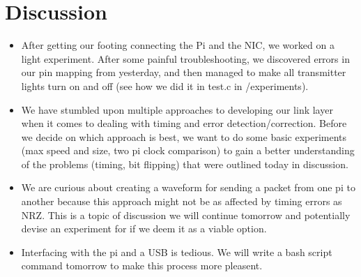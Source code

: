 \documentclass{article}
\begin{document}
\section*{Discussion}
\begin{itemize}
\item After getting our footing connecting the Pi and the NIC, we worked on a light experiment. After some
painful troubleshooting, we discovered errors in our pin mapping from yesterday, and then managed to make all
transmitter lights turn on and off (see how we did it in test.c in /experiments).
\item We have stumbled upon multiple approaches to developing our link layer when it comes to dealing with timing and error detection/correction. 
Before we decide on which approach is best, we want to do some basic experiments (max speed and size, two pi clock comparison) to gain a better understanding
of the problems (timing, bit flipping) that were outlined today in discussion.
\item We are curious about creating a waveform for sending a packet from one pi to another because this approach might not be as affected by timing errors as NRZ. This is
a topic of discussion we will continue tomorrow and potentially devise an experiment for if we deem it as a viable option. 
\item Interfacing with the pi and a USB is tedious. We will write a bash script command tomorrow to make this process more pleasent. 
\end{itemize}

\end{document}
